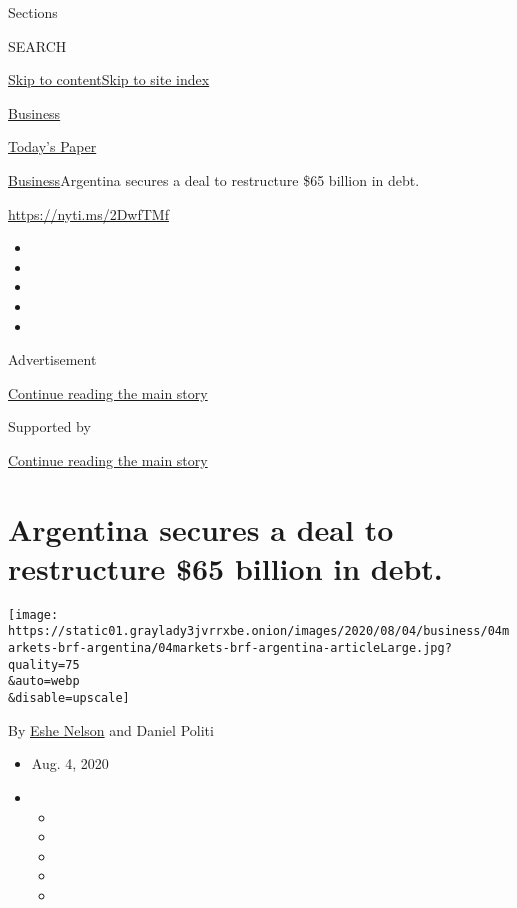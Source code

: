 Sections

SEARCH

\protect\hyperlink{site-content}{Skip to
content}\protect\hyperlink{site-index}{Skip to site index}

\href{https://www.nytimes3xbfgragh.onion/section/business}{Business}

\href{https://myaccount.nytimes3xbfgragh.onion/auth/login?response_type=cookie\&client_id=vi}{}

\href{https://www.nytimes3xbfgragh.onion/section/todayspaper}{Today's
Paper}

\href{/section/business}{Business}\textbar{}Argentina secures a deal to
restructure \$65 billion in debt.

\url{https://nyti.ms/2DwfTMf}

\begin{itemize}
\item
\item
\item
\item
\item
\end{itemize}

Advertisement

\protect\hyperlink{after-top}{Continue reading the main story}

Supported by

\protect\hyperlink{after-sponsor}{Continue reading the main story}

\hypertarget{argentina-secures-a-deal-to-restructure-65-billion-in-debt}{%
\section{Argentina secures a deal to restructure \$65 billion in
debt.}\label{argentina-secures-a-deal-to-restructure-65-billion-in-debt}}

\texttt{[image: https://static01.graylady3jvrrxbe.onion/images/2020/08/04/business/04markets-brf-argentina/04markets-brf-argentina-articleLarge.jpg?quality=75\\\&auto=webp\\\&disable=upscale]}

By \href{https://www.nytimes3xbfgragh.onion/by/eshe-nelson}{Eshe Nelson}
and Daniel Politi

\begin{itemize}
\item
  Aug. 4, 2020
\item
  \begin{itemize}
  \item
  \item
  \item
  \item
  \item
  \end{itemize}
\end{itemize}

